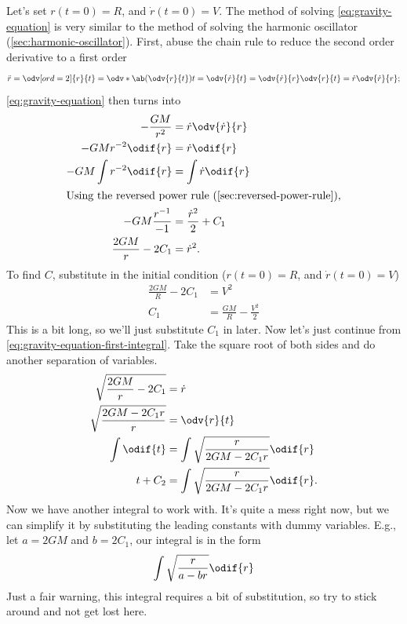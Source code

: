 Let's set $r(t = 0) = R$, and $\dot{r}(t = 0) = V$. The method of solving \cref{eq:gravity-equation} is very similar to the method of solving the harmonic oscillator (\cref{sec:harmonic-oscillator}). First, abuse the chain rule to reduce the second order derivative to a first order
\begin{align}
	\ddot{r} = \odv[ord = 2]{r}{t} = \odv*{\ab(\odv{r}{t})}{t} = \odv{\dot{r}}{t} = \odv{\dot{r}}{r}\odv{r}{t} = \dot{r}\odv{\dot{r}}{r};
\end{align}
\cref{eq:gravity-equation} then turns into
\begin{align}
	-\frac{GM}{r^2}        & = \dot{r}\odv{\dot{r}}{r}                               \\
	-GMr^{-2}\odif{r}      & = \dot{r}\odif{r}                                       \\
	-GM\int r^{-2}\odif{r} & = \int\dot{r}\odif{r}                                   \\
	\intertext{Using the reversed power rule (\cref{sec:reversed-power-rule}),}
	-GM\frac{r^{-1}}{-1}   & = \frac{\dot{r}^2}{2} + C_1                             \\
	\frac{2GM}{r} - 2C_1   & = \dot{r}^2. \label{eq:gravity-equation-first-integral}
\end{align}
To find $C$, substitute in the initial condition ($r(t = 0) = R$, and $\dot{r}(t = 0) = V$)
\begin{align}
	\frac{2GM}{R} - 2C_1 & = V^2                          \\
	C_1                  & = \frac{GM}{R} - \frac{V^2}{2}
\end{align}
This is a bit long, so we'll just substitute $C_1$ in later. Now let's just continue from \cref{eq:gravity-equation-first-integral}. Take the square root of both sides and do another separation of variables.
\begin{align}
	\sqrt{\frac{2GM}{r} - 2C_1}  & = \dot{r}                                   \\
	\sqrt{\frac{2GM - 2C_1r}{r}} & = \odv{r}{t}                                \\
	\int\odif{t}                 & = \int\sqrt{\frac{r}{2GM - 2C_1r}}\odif{r}  \\
	t + C_2                      & = \int\sqrt{\frac{r}{2GM - 2C_1r}}\odif{r}.
\end{align}
Now we have another integral to work with. It's quite a mess right now, but we can simplify it by substituting the leading constants with dummy variables. E.g., let $a = 2GM$ and $b = 2C_1$, our integral is in the form
\begin{equation}
	\int\sqrt{\frac{r}{a - br}}\odif{r} \label{eq:gravity-dummy1}
\end{equation}
Just a fair warning, this integral requires a bit of substitution, so try to stick around and not get lost here.

